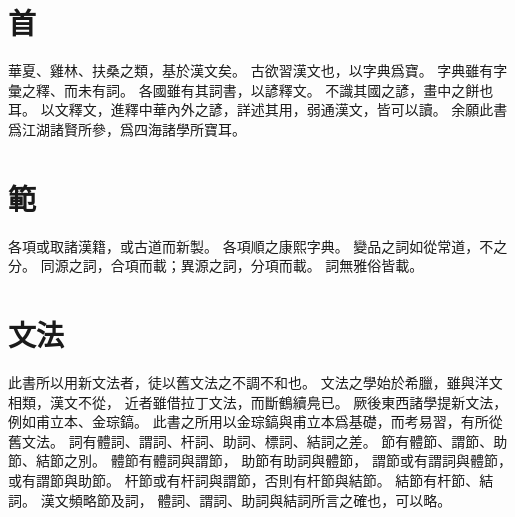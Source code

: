 \section{首}
華夏、雞林、扶桑之類，基於漢文矣。
古欲習漢文也，以字典爲寶。
字典雖有字彙之釋、而未有詞。
各國雖有其詞書，以諺釋文。
不識其國之諺，畫中之餅也耳。
以文釋文，進釋中華內外之諺，詳述其用，弱通漢文，皆可以讀。
余願此書爲江湖諸賢所參，爲四海諸學所寶耳。
\section{範}
各項或取諸漢籍，或古道而新製。
各項順之康熙字典。
變品之詞如從常道，不之分。
同源之詞，合項而載；異源之詞，分項而載。
詞無雅俗皆載。
\section{文法}
此書所以用新文法者，徒以舊文法之不調不和也。
文法之學始於希臘，雖與洋文相類，漢文不從，
近者雖借拉丁文法，而斷鶴續鳧已。
厥後東西諸學提新文法，例如甫立本、金琮鎬。
此書之所用以金琮鎬與甫立本爲基礎，而考易習，有所從舊文法。
詞有體詞、謂詞、杆詞、助詞、標詞、結詞之差。
節有體節、謂節、助節、結節之別。
體節有體詞與謂節，
助節有助詞與體節，
謂節或有謂詞與體節，或有謂節與助節。
杆節或有杆詞與謂節，否則有杆節與結節。
結節有杆節、結詞。
漢文頻略節及詞，
體詞、謂詞、助詞與結詞所言之確也，可以略。

